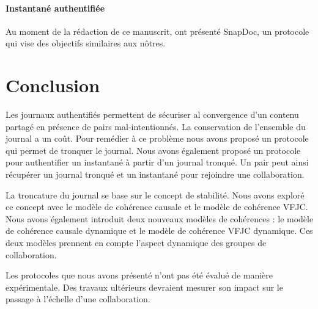 \paragraph{Instantané authentifiée} Au moment de la rédaction de ce manuscrit, \textcite{kollmann2019_snapdoc} ont présenté SnapDoc, un protocole qui vise des objectifs similaires aux nôtres.


\section{Conclusion}

Les journaux authentifiés permettent de sécuriser al convergence d'un contenu partagé en présence de pairs mal-intentionnés.
La conservation de l'ensemble du journal a un coût.
Pour remédier à ce problème nous avons proposé un protocole qui permet de tronquer le journal.
Nous avons également proposé un protocole pour authentifier un instantané à partir d'un journal tronqué.
Un pair peut ainsi récupérer un journal tronqué et un instantané pour rejoindre une collaboration.

La troncature du journal se base sur le concept de stabilité.
Nous avons exploré ce concept avec le modèle de cohérence causale et le modèle de cohérence \ac{VFJC}.
Nous avons également introduit deux nouveaux modèles de cohérences : le modèle de cohérence causale dynamique et le modèle de cohérence \ac{VFJC} dynamique.
Ces deux modèles prennent en compte l'aspect dynamique des groupes de collaboration.

Les protocoles que nous avons présenté n'ont pas été évalué de manière expérimentale.
Des travaux ultérieurs devraient mesurer son impact sur le passage à l'échelle d'une collaboration.
